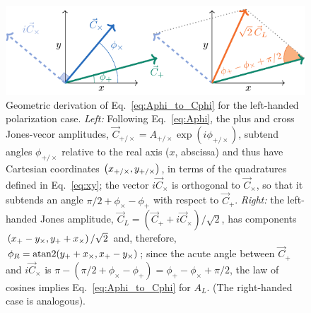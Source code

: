 \documentclass[aps,prd,twocolumn,superscriptaddress,preprintnumbers,floatfix,nofootinbib]{revtex4-2}
\begin{document}
\begin{figure}
\includegraphics[width=\columnwidth]{diagram_apac}
\caption{Geometric derivation of Eq.~\eqref{eq:Aphi_to_Cphi} for the left-handed polarization case.
\emph{Left:} Following Eq.~\eqref{eq:Aphi}, the plus and cross Jones-vecor amplitudes, $\vec{C}_{+/\times} = A_{+/\times} \exp(i \phi_{+/\times})$, subtend angles $\phi_{+/\times}$ relative to the real axis ($x$, abscissa) and thus have Cartesian coordinates $\left(x_{+/\times}, y_{+/\times} \right)$, in terms of the quadratures defined in Eq.~\eqref{eq:xy}; the vector $i\vec{C}_\times$ is orthogonal to $\vec{C}_\times$, so that it subtends an angle $\pi/2 + \phi_\times-\phi_+$ with respect to $\vec{C}_+$.
\emph{Right:} the left-handed Jones amplitude, $\vec{C}_L = (\vec{C}_+ + i \vec{C}_\times)/\sqrt{2}$, has components $\left(x_{+} - y_{\times}, y_{+} + x_{\times}\right)/\sqrt{2}$ and, therefore, $\phi_R = \mathrm{atan2}( y_{+} + x_{\times}, x_{+} - y_{\times})$; since the acute angle between $\vec{C}_+$ and $i\vec{C}_\times$ is $\pi - (\pi /2 + \phi_\times - \phi_+) = \phi_+ - \phi_\times + \pi/2$, the law of cosines implies Eq.~\eqref{eq:Aphi_to_Cphi} for $A_L$. (The right-handed case is analogous).
}
\label{fig:diagram_apac}
\end{figure}
\end{document}
